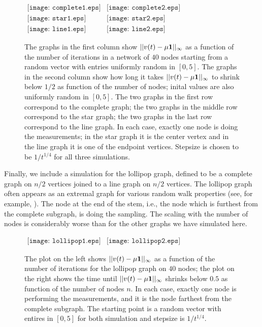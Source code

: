 \documentclass[final]{siamltex}
\begin{document}
\begin{figure}[h]  
\begin{center}$
\begin{array}{cc}
\texttt{[image: complete1.eps]} &
\texttt{[image: complete2.eps]}  \\ 
\texttt{[image: star1.eps]} & 
\texttt{[image: star2.eps]}  \\
\texttt{[image: line1.eps]}  &
\texttt{[image: line2.eps]} 
\end{array}$
\end{center} 
\caption{The graphs in the first column show $||v(t) - \mu {{\bf 1}}||_{\infty}$ as a function of the number of iterations in a network of $40$ nodes starting from a random vector with entries uniformly random in $[0,5]$. The graphs in the second column show how long it takes $||v(t) - \mu {{\bf 1}}||_{\infty}$ to shrink below $1/2$ as function of the number of nodes; inital values are also uniformly random in $[0,5]$.  The two graphs in the first row correspond to the complete graph; the  two graphs in the middle row correspond to the star graph; the two graphs in the last row 
correspond to the line graph. In each case, exactly one node is doing
the measurements; in the star graph it is the center vertex and in the line graph it is one of the endpoint vertices. Stepsize is chosen to be $1/t^{1/4}$ for all three simulations.} \label{threeplots}
 \end{figure}

Finally, we include a simulation for the lollipop graph, defined to be a complete graph on $n/2$ vertices joined to a line graph on $n/2$ vertices. The lollipop graph often appears as an extremal graph for various random walk properties (see, for example, \cite{bw90}). {{{The node at the end of the stem, i.e., the node which is furthest from the complete subgraph, is doing the sampling.}}} The scaling with the number of nodes is  considerably worse than for the other graphs we have simulated here. 

\begin{figure}[h] 
\begin{center}$
\begin{array}{cc}
\texttt{[image: lollipop1.eps]} &
\texttt{[image: lollipop2.eps]} 
\end{array}$
\end{center}
\caption{The plot on the left shows $||v(t) - \mu {{\bf 1}}||_{\infty}$ as a function of the number of iterations for the lollipop graph on $40$ nodes; the plot on the right shows the time until $||v(t) - \mu {{\bf 1}}||_{\infty}$ shrinks below $0.5$ as function of the number of nodes $n$. In each case, exactly one node is performing the measurements, and it is the node farthest from the complete subgraph. The starting point is a random vector with entires in $[0,5]$ for both simulation and stepsize is $1/t^{1/4}$. } \label{lollipop}
\end{figure}
\end{document}
